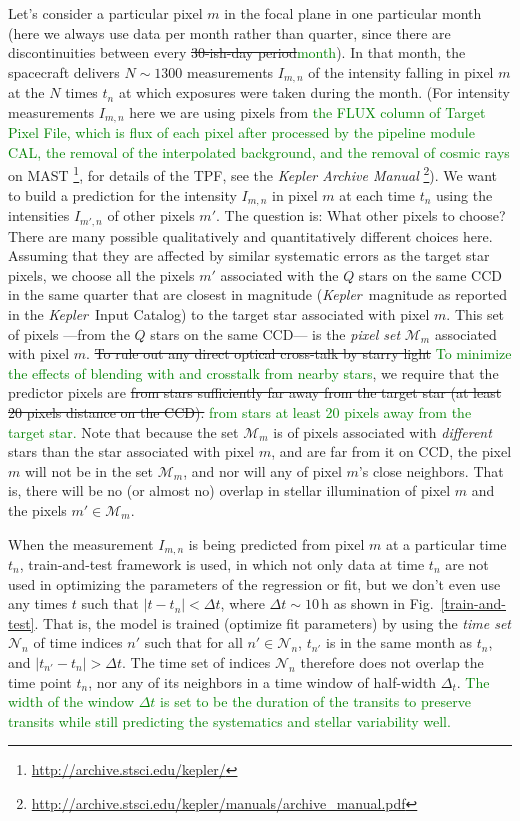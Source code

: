 \documentclass[12pt, preprint]{aastex}
\newcommand{\project}[1]{\textsl{#1}}
\newcommand{\Kepler}{\project{Kepler}}
\newcommand{\set}[1]{\mathcal{#1}}
\newcommand{\revise}[1]{\textcolor{green}{#1}}
\newcommand{\remove}[1]{\sout{#1}}
\begin{document}
Let's consider a particular pixel $m$ in the focal plane in one particular month
  (here we always use data per month rather than quarter,  since there are discontinuities between every \remove{30-ish-day period}\revise{month}).
In that month, the spacecraft delivers $N\sim 1300$ measurements $I_{m,n}$
  of the intensity falling in pixel $m$ at the $N$ times $t_n$ at which exposures were taken during the month.
(For intensity measurements $I_{m,n}$ here we are using pixels from \revise{the FLUX column of Target Pixel File, which is flux of each pixel after processed by the pipeline module CAL, the removal of the interpolated background, and the removal of cosmic rays} on MAST
  \footnote{\url{http://archive.stsci.edu/kepler/}}, for details of the TPF, 
  see the \project{Kepler Archive Manual} 
  \footnote{\url{http://archive.stsci.edu/kepler/manuals/archive_manual.pdf}}).
We want to build a prediction for the intensity $I_{m,n}$ in pixel $m$ at each time $t_n$
  using the intensities $I_{m',n}$ of other pixels $m'$.
The question is:  What other pixels to choose?
There are many possible qualitatively and quantitatively different choices here.
Assuming that they are affected by similar systematic errors as the target star pixels, 
  we choose all the pixels $m'$ associated with the $Q$ stars on the same CCD in the same quarter that are closest in magnitude
  (\Kepler\ magnitude as reported in the \Kepler\ Input Catalog)
  to the target star associated with pixel $m$.
This set of pixels%
  ---from the $Q$ stars on the same CCD---%
  is the \emph{pixel set} $\set{M}_m$ associated with pixel $m$.
  \remove{To rule out any direct optical cross-talk by starry light}
  \revise{To minimize the effects of blending with and crosstalk from nearby stars}, we require that the predictor pixels are \remove{from stars
sufficiently far away from the target star (at least 20 pixels distance on the CCD).}
\revise{from stars at least 20 pixels away from the target star.}
Note that because the set $\set{M}_m$ is of pixels associated with \emph{different} stars
  than the star associated with pixel $m$, and are far from it on CCD, 
  the pixel $m$ will not be in the set $\set{M}_m$,
  and nor will any of pixel $m$'s close neighbors.
That is, there will be no (or almost no) overlap in stellar illumination of pixel $m$
  and the pixels $m'\in\set{M}_m$.

When the measurement $I_{m,n}$ is being predicted from pixel $m$ at a particular time $t_n$,
  train-and-test framework is used, in which not only
  data at time $t_n$ are not used in optimizing the parameters of the regression or fit,
  but we don't even use any times $t$ such that $|t-t_n| < \Delta t$,
  where $\Delta t\sim 10$\,h as shown in Fig.~\ref{train-and-test}.
That is, the model is trained (optimize fit parameters) by using the \emph{time set} $\set{N}_n$ of time
  indices $n'$ such that for all $n'\in\set{N}_n$,
  $t_{n'}$ is in the same month as $t_n$,
  and $|t_{n'} - t_n|>\Delta t$.
The time set of indices $\set{N}_n$ therefore does not overlap the time point $t_n$,
  nor any of its neighbors in a time window of half-width $\Delta_t$. 
\revise{The width of the window $\Delta t$ is set to be the duration of the transits to preserve transits while still predicting the systematics and stellar variability well.}
  
\end{document}
